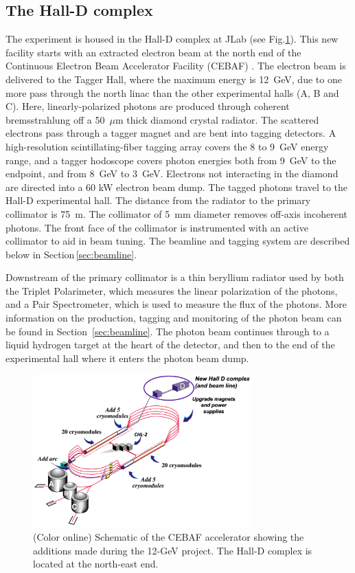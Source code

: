 \subsection[The Hall-D complex]{The Hall-D complex \label{sec:gluexexperiment:complex}}
The \gx{} experiment is housed in the Hall-D complex at JLab (see Fig.\ref{fig:CEBAF-graphic}). This new facility starts with an extracted electron beam at the north end of the Continuous Electron Beam Accelerator Facility (CEBAF) \cite{Leemann:2001dg,CEBAF12GeV}. The electron beam is delivered to the Tagger Hall, where the maximum energy is 12~GeV, due to one more pass through the north linac than the other experimental halls (A, B and C).  Here, linearly-polarized photons are produced through coherent bremsstrahlung off a 50~$\mu$m thick diamond crystal radiator.
The scattered electrons pass through a tagger magnet and are bent into tagging detectors. A high-resolution scintillating-fiber tagging array covers the 8 to 9~GeV energy range, and a tagger hodoscope covers photon energies both from 9~GeV to the endpoint, and from 8~GeV to 3~GeV. Electrons not interacting in the diamond are directed into a 60 kW electron beam dump. The tagged photons travel to the Hall-D experimental hall. The distance from the radiator to the primary collimator is 75~m. The collimator of 5~mm diameter removes off-axis incoherent photons. The front face of the collimator is instrumented with an active collimator to aid in beam tuning.  The beamline and tagging system are described below in Section\,\ref{sec:beamline}.

Downstream of the primary collimator is a thin beryllium radiator used by both the Triplet Polarimeter, which measures the linear polarization of the photons, and a Pair Spectrometer, which is used to measure the flux of the photons. More information on the production, tagging and monitoring of the photon beam can be found in Section~\ref{sec:beamline}. 
The photon beam continues through to a liquid hydrogen target at the heart of the \gx{} detector, and then to the end of the experimental hall where it enters the photon beam dump.

\begin{figure}[tbp]\centering
\includegraphics[width=0.75\textwidth]{figures/CEBAF-graphic.png}
\caption[]{\label{fig:CEBAF-graphic}(Color online) Schematic of the CEBAF accelerator showing the additions made during the 12-GeV project. The Hall-D complex is located at the north-east end.}
\end{figure}

